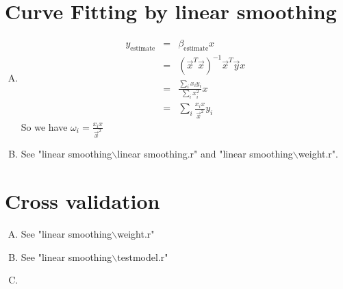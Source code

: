 \documentclass{article}
\begin{document}
\section{Curve Fitting by linear smoothing}
\begin{enumerate}[(A)]
\item
\begin{eqnarray}
y_{\textrm{estimate}}&=&\beta_{\textrm{estimate}}x\nonumber\\
&=&(\vec{x}^T\vec{x})^{-1}\vec{x}^T\vec{y}x\nonumber\\
&=&\frac{\sum_ix_iy_i}{\sum_ix_i^2}x\nonumber\\
&=&\sum_i\frac{x_ix}{\vec{x}^2}y_i
\end{eqnarray}
So we have $\omega_i=\frac{x_ix}{\vec{x}^2}$
\item

See "linear smoothing$\backslash$linear smoothing.r" and "linear smoothing$\backslash$weight.r".
\end{enumerate}

\section{Cross validation}
\begin{enumerate}[(A)]
\item
See "linear smoothing$\backslash$weight.r"
\item
See "linear smoothing$\backslash$testmodel.r"
\item
\end{enumerate}
\end{document}
